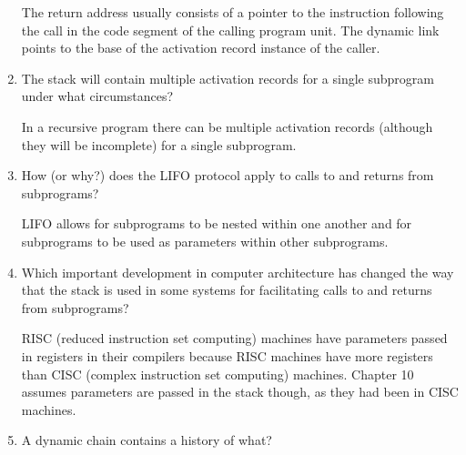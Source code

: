 \begin{enumerate}
  \begin{answer}

  	The return address usually consists of a pointer to the instruction following the call in the code segment of the calling program unit.  The dynamic link points to the base of the activation record instance of the caller.

  \end{answer}

  \item The stack will contain multiple activation
    records for a single subprogram under what
    circumstances?

  \begin{answer}

  	In a recursive program there can be multiple activation records (although they will be incomplete) for a single subprogram.

  \end{answer}

  \item How (or why?) does the LIFO protocol apply to
    calls to and returns from subprograms?

  \begin{answer}

  	LIFO allows for subprograms to be nested within one another and for subprograms to be used as parameters within other subprograms.

  \end{answer}

  \item Which important development in computer architecture
    has changed the way that the stack is used in some
    systems for facilitating calls to and returns from
    subprograms?

  \begin{answer}

  	RISC (reduced instruction set computing) machines have parameters passed in registers in their compilers because RISC machines have more registers than CISC (complex instruction set computing) machines. Chapter 10 assumes parameters are passed in the stack though, as they had been in CISC machines.

  \end{answer}

  \item A dynamic chain contains a history of what?

  \begin{answer}


\end{answer}
\end{enumerate}
